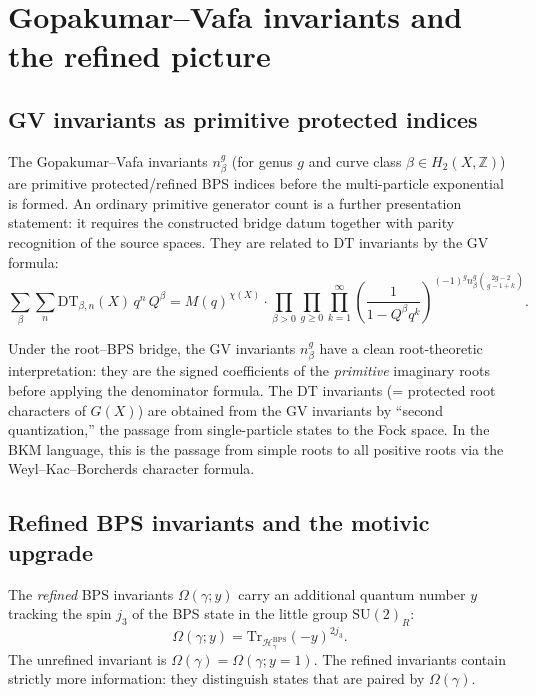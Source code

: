 \documentclass[11pt]{article}
\theoremstyle{definition}
\newcommand{\Tr}{\mathrm{Tr}}
\newcommand{\DT}{\mathrm{DT}}
\newcommand{\bZ}{\mathbb{Z}}
\begin{document}
\section{Gopakumar--Vafa invariants and the refined picture}
\label{sec:gv}

\subsection{GV invariants as primitive protected indices}

The Gopakumar--Vafa invariants $n^g_\beta$ (for genus $g$ and curve
class $\beta \in H_2(X,\bZ)$) are primitive protected/refined BPS
indices before the multi-particle exponential is formed. An ordinary
primitive generator count is a further presentation statement: it requires
the constructed bridge datum together with parity recognition of the
source spaces. They are related to DT invariants by the GV formula:
\[
 \sum_{\beta} \sum_{n} \DT_{\beta,n}(X) \, q^n \, Q^\beta
 = M(q)^{\chi(X)} \cdot
 \prod_{\beta > 0} \prod_{g \geq 0} \prod_{k=1}^\infty
 \left( \frac{1}{1 - Q^\beta q^k} \right)^{(-1)^g n^g_\beta \binom{2g-2}{g-1+k}}.
\]

Under the root--BPS bridge, the GV invariants $n^g_\beta$ have a clean
root-theoretic interpretation: they are the signed coefficients of the
\emph{primitive} imaginary roots before applying the denominator
formula. The DT
invariants (= protected root characters of $G(X)$) are obtained from the
GV invariants by ``second quantization,'' the passage from
single-particle states to the Fock space. In the BKM language, this
is the passage from simple roots to all positive roots via the
Weyl--Kac--Borcherds character formula.

\subsection{Refined BPS invariants and the motivic upgrade}

The \emph{refined} BPS invariants $\Omega(\gamma; y)$ carry an
additional quantum number $y$ tracking the spin $j_3$ of the BPS
state in the little group $\mathrm{SU}(2)_R$:
\[
 \Omega(\gamma; y) = \Tr_{\mathcal{H}_\gamma^{\mathrm{BPS}}}
 (-y)^{2j_3}.
\]
The unrefined invariant is $\Omega(\gamma) = \Omega(\gamma; y=1)$.
The refined invariants contain strictly more information: they
distinguish states that are paired by $\Omega(\gamma)$.
\end{document}
